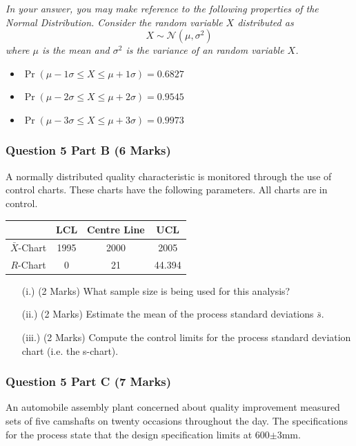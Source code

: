 \documentclass[a4paper,12pt]{article}
\begin{document}
\bigskip 
\begin{framed}
	\noindent \textit{In your answer, you may make reference to the following properties of the Normal Distribution. Consider the random variable $X$ distributed as
		\[X \sim \mathcal{N}(\mu,\sigma^2)\]
		where $\mu$ is the mean and $\sigma^2$ is the variance of an random variable $X$.}
	\begin{itemize}
		\item $\Pr( \mu - 1\sigma \leq X \leq \mu + 1\sigma ) = 0.6827$
		\item $\Pr( \mu - 2\sigma \leq X \leq \mu + 2\sigma ) = 0.9545$
		\item $\Pr( \mu - 3\sigma \leq X \leq \mu + 3\sigma )= 0.9973$
		
	\end{itemize}
\end{framed}
\newpage

\subsubsection*{Question 5 Part B (6 Marks)}
A normally distributed quality characteristic is monitored through the use of control charts. These charts have the following parameters. All charts are in control.
\begin{center}
	\begin{tabular}{|c|c|c|c|}
		\hline  & LCL & Centre Line & UCL \\
		\hline $\bar{X}$-Chart & 1995 & 2000 & 2005 \\
		\hline $R$-Chart & 0 & 21 & 44.394 \\ \hline
	\end{tabular}
\end{center}

\begin{itemize}
	\item[(i.)] (2 Marks) What sample size is being used for this analysis?
	\item[(ii.)] (2 Marks) Estimate the mean of the process standard deviations $\bar{s}$.
	\item[(iii.)] (2 Marks) Compute the control limits for the process standard deviation chart (i.e. the s-chart).
\end{itemize}


\subsubsection*{Question 5 Part C (7 Marks)}
An automobile assembly plant concerned about quality improvement measured sets of five camshafts on twenty occasions throughout the day. The specifications for the process state that the design specification limits at 600$\pm$3mm.
\end{document}
